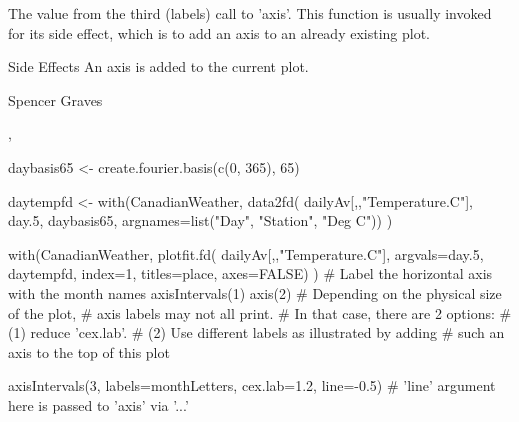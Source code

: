 \begin{Value}
The value from the third (labels) call to 'axis'.  This function is
usually invoked for its side effect, which is to add an axis to an
already existing plot.
\end{Value}
\begin{Section}{Side Effects}
An axis is added to the current plot.
\end{Section}
\begin{Author}\relax
Spencer Graves
\end{Author}
\begin{SeeAlso}\relax
{}, 
\end{SeeAlso}
\begin{Examples}
\begin{ExampleCode}
daybasis65 <- create.fourier.basis(c(0, 365), 65)

daytempfd <- with(CanadianWeather, data2fd(
       dailyAv[,,"Temperature.C"], day.5,
       daybasis65, argnames=list("Day", "Station", "Deg C")) )
 
with(CanadianWeather, plotfit.fd(
      dailyAv[,,"Temperature.C"], argvals=day.5,
          daytempfd, index=1, titles=place, axes=FALSE) )
# Label the horizontal axis with the month names
axisIntervals(1) 
axis(2)
# Depending on the physical size of the plot,
# axis labels may not all print.
# In that case, there are 2 options:
# (1) reduce 'cex.lab'.
# (2) Use different labels as illustrated by adding
#     such an axis to the top of this plot 

axisIntervals(3, labels=monthLetters, cex.lab=1.2, line=-0.5) 
# 'line' argument here is passed to 'axis' via '...' 

\end{ExampleCode}
\end{Examples}

